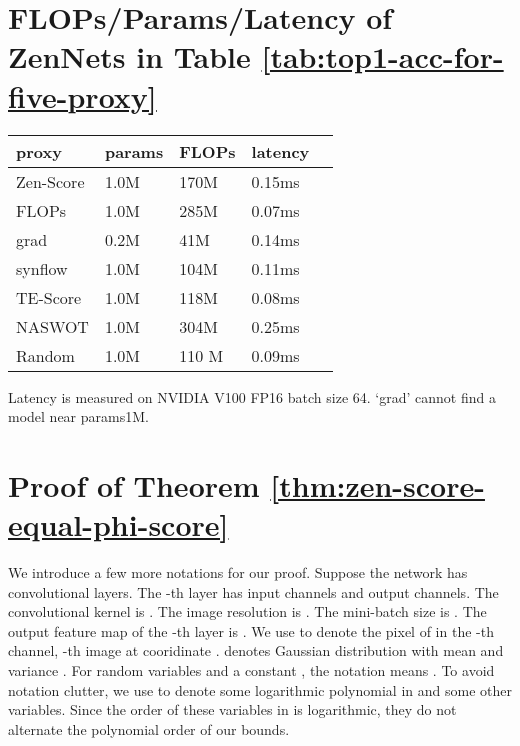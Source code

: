 \documentclass{article}
\begin{document}
\section{FLOPs/Params/Latency of ZenNets in Table \ref{tab:top1-acc-for-five-proxy}}

\begin{center}
 \begin{tabular}{@{}lllll@{}}
    \toprule
    proxy     & params & FLOPs & latency &  \\ \midrule
    Zen-Score & 1.0M   & 170M  & 0.15ms  &  \\
    FLOPs     & 1.0M   & 285M  & 0.07ms  &  \\
    grad      & 0.2M   & 41M  & 0.14ms  &  \\
    synflow   & 1.0M   & 104M  & 0.11ms  &  \\
    TE-Score  & 1.0M   & 118M  & 0.08ms  &  \\
    NASWOT    & 1.0M   & 304M  & 0.25ms  &  \\
    Random    & 1.0M   & 110 M & 0.09ms  &  \\ \bottomrule
 \end{tabular}      
\end{center}

Latency is measured on NVIDIA V100 FP16 batch size 64. `grad' cannot find a model near params1M. 








\clearpage \newpage
\onecolumn



\section{Proof of Theorem \ref{thm:zen-score-equal-phi-score}}

\label{sec:Proof-of-Theorem-1}

We introduce a few more notations for our proof. Suppose the network
has  convolutional layers. The -th layer has  input
channels and  output channels. The convolutional kernel is
.
The image resolution is . The mini-batch size is .
The output feature map of the -th layer is .
We use  to denote the pixel of 
in the -th channel, -th image at cooridinate . 
denotes Gaussian distribution with mean  and variance .
For random variables  and a constant , the notation 
means . To avoid notation clutter, we use  to denote some logarithmic polynomial in  and some other variables. Since the order of these variables in  is logarithmic, they do not alternate the polynomial order of our bounds.
\end{document}
